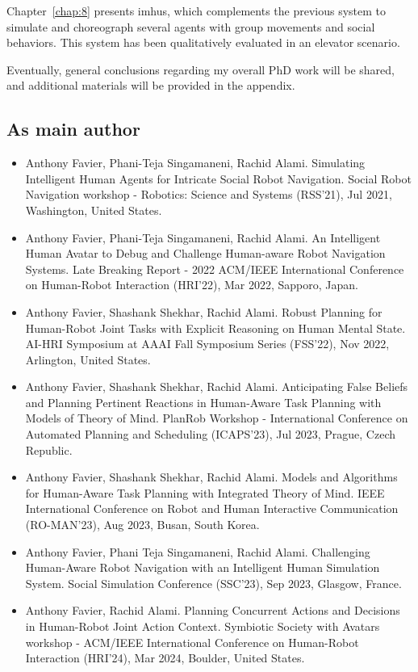Chapter~\ref{chap:8} presents \acrshort{imhus}, which complements the previous system to simulate and choreograph several agents with group movements and social behaviors. This system has been qualitatively evaluated in an elevator scenario.


Eventually, general conclusions regarding my overall PhD work will be shared, and additional materials will be provided in the appendix.  


\subsection*{As main author}
\begin{itemize}

    \item Anthony Favier, Phani-Teja Singamaneni, Rachid Alami. Simulating Intelligent Human Agents for Intricate Social Robot Navigation. Social Robot Navigation workshop - Robotics: Science and Systems (RSS'21), Jul 2021, Washington, United States. 
    \item Anthony Favier, Phani-Teja Singamaneni, Rachid Alami. An Intelligent Human Avatar to Debug and Challenge Human-aware Robot Navigation Systems. Late Breaking Report - 2022 ACM/IEEE International Conference on Human-Robot Interaction (HRI'22), Mar 2022, Sapporo, Japan. 
    \item Anthony Favier, Shashank Shekhar, Rachid Alami. Robust Planning for Human-Robot Joint Tasks with Explicit Reasoning on Human Mental State. AI-HRI Symposium at AAAI Fall Symposium Series (FSS'22), Nov 2022, Arlington, United States. 
    \item Anthony Favier, Shashank Shekhar, Rachid Alami. Anticipating False Beliefs and Planning Pertinent Reactions in Human-Aware Task Planning with Models of Theory of Mind. PlanRob Workshop - International Conference on Automated Planning and Scheduling (ICAPS'23), Jul 2023, Prague, Czech Republic. 
    \item Anthony Favier, Shashank Shekhar, Rachid Alami. Models and Algorithms for Human-Aware Task Planning with Integrated Theory of Mind. IEEE International Conference on Robot and Human Interactive Communication (RO-MAN'23), Aug 2023, Busan, South Korea. 
    \item Anthony Favier, Phani Teja Singamaneni, Rachid Alami. Challenging Human-Aware Robot Navigation with an Intelligent Human Simulation System. Social Simulation Conference (SSC'23), Sep 2023, Glasgow, France. 
    \item Anthony Favier, Rachid Alami. Planning Concurrent Actions and Decisions in Human-Robot Joint Action Context. Symbiotic Society with Avatars workshop - ACM/IEEE International Conference on Human-Robot Interaction (HRI'24), Mar 2024, Boulder, United States.

\end{itemize}
    

